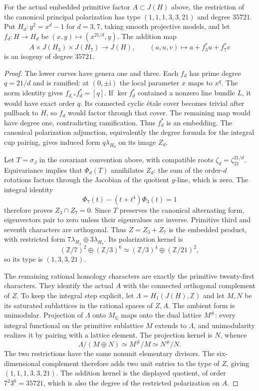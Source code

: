 \begin{proposition}
\label{pp:prop:fermatrestricted}
For the actual embedded primitive factor $A\subset J(H)$ above,
the restriction of the canonical principal polarization has type
$(1,1,1,3,3,21)$ and degree $35721$. Put
$H_d:y^2=x^d-1$ for $d=3,7$, taking smooth projective models,
and let $f_d:H\to H_d$ be $(x,y)\mapsto(x^{21/d},y)$.
The addition map
\[
 A\times J(H_3)\times J(H_7)\longrightarrow J(H),\qquad
 (a,u,v)\longmapsto a+f_3^*u+f_7^*v
\]
is an isogeny of degree $35721$.
\end{proposition}
\begin{proof}
The lower curves have genera one and three. Each $f_d$ has prime
degree $q=21/d$ and is ramified: at $(0,\pm\mathrm i)$ the local
parameter $x$ maps to $x^q$. The norm identity gives
$f_{d,*}f_d^*=[q]$. If $\ker f_d^*$ contained a nonzero line bundle
$L$, it would have exact order $q$. Its connected cyclic \'etale
cover becomes trivial after pullback to $H$, so $f_d$ would factor
through that cover. The remaining map would have degree one,
contradicting ramification. Thus $f_d^*$ is an embedding.
The canonical polarization adjunction, equivalently the degree
formula for the integral cup pairing, gives induced form
$q\lambda_{H_d}$ on its image $Z_d$.

Let $T=\sigma_J$ in the covariant convention above, with compatible
roots $\zeta_d=\zeta_{21}^{21/d}$. Equivariance
implies that $\Phi_d(T)$ annihilates $Z_d$: the sum of the
order-$d$ rotations factors through the Jacobian of the quotient
$y$-line, which is zero. The integral identity
\[
 \Phi_7(t)-(t+t^4)\Phi_3(t)=1
\]
therefore proves $Z_3\cap Z_7=0$. Since $T$ preserves the canonical
alternating form, eigenvectors pair to zero unless their eigenvalues
are inverse. Primitive third and seventh characters are orthogonal.
Thus $Z=Z_3+Z_7$ is the embedded product, with restricted form
$7\lambda_{H_3}\oplus3\lambda_{H_7}$. Its polarization kernel is
\[
 (\mathbb Z/7)^2\oplus(\mathbb Z/3)^6
 \simeq(\mathbb Z/3)^4\oplus(\mathbb Z/21)^2,
\]
so its type is $(1,3,3,21)$.

The remaining rational homology characters are exactly the primitive
twenty-first characters. They identify the actual $A$ with the
connected orthogonal complement of $Z$. To keep the integral step
explicit, let $\Lambda=H_1(J(H),\mathbb Z)$ and let $M,N$ be its
saturated sublattices in the rational spaces of $Z,A$. The ambient
form is unimodular. Projection of $\Lambda$ onto $M_{\mathbb Q}$
maps onto the dual lattice $M^\#$: every integral functional on the
primitive sublattice $M$ extends to $\Lambda$, and unimodularity
realizes it by pairing with a lattice element. The projection kernel
is $N$, whence
\[
 \Lambda/(M\oplus N)\simeq M^\#/M\simeq N^\#/N.
\]
The two restrictions have the same nonunit elementary divisors.
The six-dimensional complement therefore adds two unit entries to
the type of $Z$, giving $(1,1,1,3,3,21)$. The addition kernel is the
displayed quotient, of order $7^2 3^6=35721$, which is also the degree
of the restricted polarization on $A$.
\end{proof}

